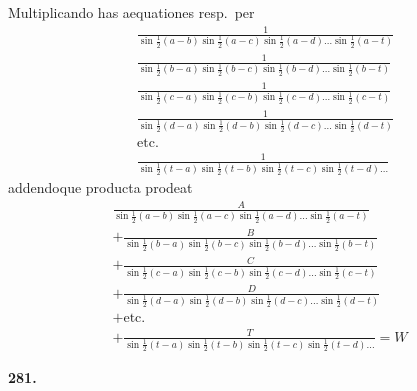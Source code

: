\documentclass[12pt,a4paper]{article}
\begin{document}
\smallskip\noindent
Multiplicando has aequationes resp.\ per
\begin{align*}
&\frac{1}{\sin\tfrac{1}{2}(a-b)\sin\tfrac{1}{2}(a-c)\sin\tfrac{1}{2}(a-d)\dots\sin\tfrac{1}{2}(a-t)}\\
&\frac{1}{\sin\tfrac{1}{2}(b-a)\sin\tfrac{1}{2}(b-c)\sin\tfrac{1}{2}(b-d)\dots\sin\tfrac{1}{2}(b-t)}\\
&\frac{1}{\sin\tfrac{1}{2}(c-a)\sin\tfrac{1}{2}(c-b)\sin\tfrac{1}{2}(c-d)\dots\sin\tfrac{1}{2}(c-t)}\\
&\frac{1}{\sin\tfrac{1}{2}(d-a)\sin\tfrac{1}{2}(d-b)\sin\tfrac{1}{2}(d-c)\dots\sin\tfrac{1}{2}(d-t)}\\
&\text{etc.}\\
&\frac{1}{\sin\tfrac{1}{2}(t-a)\sin\tfrac{1}{2}(t-b)\sin\tfrac{1}{2}(t-c)\sin\tfrac{1}{2}(t-d)\dots}
\end{align*}
addendoque producta prodeat
\begin{multline*}
\frac{A}{\sin\tfrac{1}{2}(a-b)\sin\tfrac{1}{2}(a-c)\sin\tfrac{1}{2}(a-d)\dots\sin\tfrac{1}{2}(a-t)}\\
+ \frac{B}{\sin\tfrac{1}{2}(b-a)\sin\tfrac{1}{2}(b-c)\sin\tfrac{1}{2}(b-d)\dots\sin\tfrac{1}{2}(b-t)}\\
+ \frac{C}{\sin\tfrac{1}{2}(c-a)\sin\tfrac{1}{2}(c-b)\sin\tfrac{1}{2}(c-d)\dots\sin\tfrac{1}{2}(c-t)}\\
+ \frac{D}{\sin\tfrac{1}{2}(d-a)\sin\tfrac{1}{2}(d-b)\sin\tfrac{1}{2}(d-c)\dots\sin\tfrac{1}{2}(d-t)}\\
+ \text{etc.}\\
+ \frac{T}{\sin\tfrac{1}{2}(t-a)\sin\tfrac{1}{2}(t-b)\sin\tfrac{1}{2}(t-c)\sin\tfrac{1}{2}(t-d)\dots} = W
\end{multline*}

\newpage
\noindent\textbf{281.}
\end{document}
